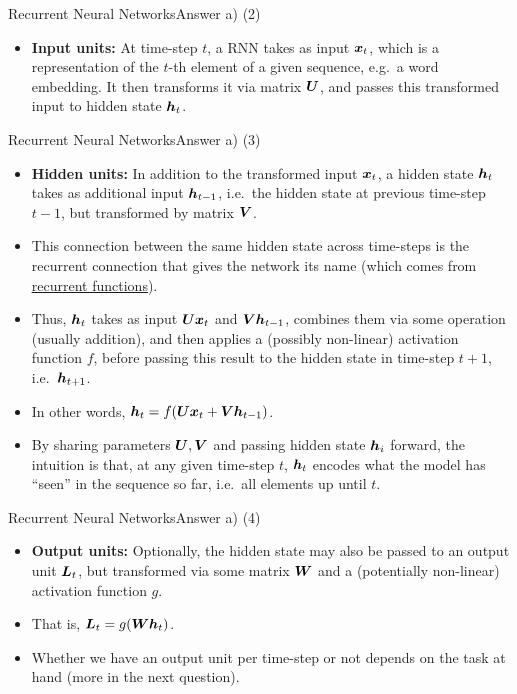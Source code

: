 \documentclass[t]{beamer}
\begin{document}
\begin{frame}{Recurrent Neural Networks}{Answer a) (2)}
    \begin{itemize}
        \item \textbf{Input units:} At time-step $t$, a RNN takes as input
              ${\boldsymbol{x}}_t$, which is a representation of the $t$-th element of a
              given sequence, e.g.\ a word embedding.
              It then transforms it via matrix ${\boldsymbol{U}}$, and passes this
              transformed input to hidden state ${\boldsymbol{h}}_t$.
    \end{itemize}
\end{frame}

\begin{frame}{Recurrent Neural Networks}{Answer a) (3)}
    \begin{itemize}
        \item \textbf{Hidden units:} In addition to the transformed input
              ${\boldsymbol{x}}_t$, a hidden state ${\boldsymbol{h}}_t$ takes as additional input
              ${\boldsymbol{h}}_{t-1}$, i.e.\ the hidden state at previous time-step $t-1$,
              but transformed by matrix ${\boldsymbol{V}}$.
        \item This connection between the same hidden state across time-steps is
              the recurrent connection that gives the network its name (which
              comes from
              \href{https://en.wikipedia.org/wiki/Recurrence_relation}{\underline{recurrent functions}}).
        \item Thus, ${\boldsymbol{h}}_{t}$ takes as input ${\boldsymbol{U}}{\boldsymbol{x}}_t$ and ${\boldsymbol{V}}{\boldsymbol{h}}_{t-1}$,
              combines them via some operation (usually addition), and then
              applies a (possibly non-linear) activation function $f$, before
              passing this result to the hidden state in time-step $t+1$, i.e.\
              ${\boldsymbol{h}}_{t+1}$.
        \item In other words, ${\boldsymbol{h}}_t = f({\boldsymbol{U}}{\boldsymbol{x}}_t + {\boldsymbol{V}}{\boldsymbol{h}}_{t-1})$.
        \item By sharing parameters ${\boldsymbol{U}},{\boldsymbol{V}}$ and passing hidden state ${\boldsymbol{h}}_i$
              forward, the intuition is that, at any given time-step $t$,
              ${\boldsymbol{h}}_{t}$ encodes what the model has ``seen'' in the sequence so
              far, i.e.\ all elements up until $t$.
    \end{itemize}
\end{frame}

\begin{frame}{Recurrent Neural Networks}{Answer a) (4)}
    \begin{itemize}
        \item \textbf{Output units:} Optionally, the hidden state may also be
              passed to an output unit ${\boldsymbol{L}}_t$, but transformed via some matrix
              ${\boldsymbol{W}}$ and a (potentially non-linear) activation function $g$.
        \item That is, ${\boldsymbol{L}}_t = g({\boldsymbol{W}}{\boldsymbol{h}}_t)$.
        \item Whether we have an output unit per time-step or not depends on the
              task at hand (more in the next question).
    \end{itemize}
\end{frame}
\end{document}
